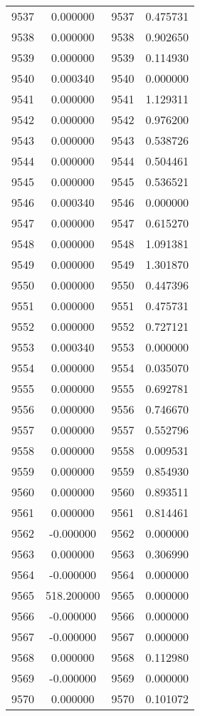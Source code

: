 \documentclass[12pt]{article}
\begin{document}
\begin{longtable}{@{}cccc@{}}
9537 & 0.000000 & 9537 & 0.475731 \\
9538 & 0.000000 & 9538 & 0.902650 \\
9539 & 0.000000 & 9539 & 0.114930 \\
9540 & 0.000340 & 9540 & 0.000000 \\
9541 & 0.000000 & 9541 & 1.129311 \\
9542 & 0.000000 & 9542 & 0.976200 \\
9543 & 0.000000 & 9543 & 0.538726 \\
9544 & 0.000000 & 9544 & 0.504461 \\
9545 & 0.000000 & 9545 & 0.536521 \\
9546 & 0.000340 & 9546 & 0.000000 \\
9547 & 0.000000 & 9547 & 0.615270 \\
9548 & 0.000000 & 9548 & 1.091381 \\
9549 & 0.000000 & 9549 & 1.301870 \\
9550 & 0.000000 & 9550 & 0.447396 \\
9551 & 0.000000 & 9551 & 0.475731 \\
9552 & 0.000000 & 9552 & 0.727121 \\
9553 & 0.000340 & 9553 & 0.000000 \\
9554 & 0.000000 & 9554 & 0.035070 \\
9555 & 0.000000 & 9555 & 0.692781 \\
9556 & 0.000000 & 9556 & 0.746670 \\
9557 & 0.000000 & 9557 & 0.552796 \\
9558 & 0.000000 & 9558 & 0.009531 \\
9559 & 0.000000 & 9559 & 0.854930 \\
9560 & 0.000000 & 9560 & 0.893511 \\
9561 & 0.000000 & 9561 & 0.814461 \\
9562 & -0.000000 & 9562 & 0.000000 \\
9563 & 0.000000 & 9563 & 0.306990 \\
9564 & -0.000000 & 9564 & 0.000000 \\
9565 & 518.200000 & 9565 & 0.000000 \\
9566 & -0.000000 & 9566 & 0.000000 \\
9567 & -0.000000 & 9567 & 0.000000 \\
9568 & 0.000000 & 9568 & 0.112980 \\
9569 & -0.000000 & 9569 & 0.000000 \\
9570 & 0.000000 & 9570 & 0.101072 \\

\end{longtable}
\end{document}
